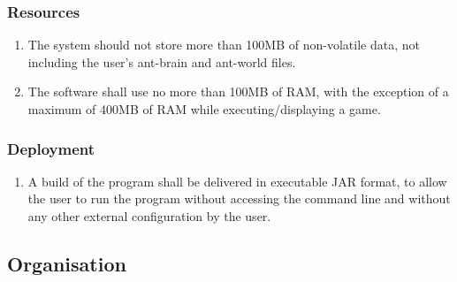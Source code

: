 \documentclass[11pt]{article}
\providecommand{\tightlist}{%
  \setlength{\itemsep}{0pt}\setlength{\parskip}{0pt}}
\begin{document}
\subsubsection{Resources}\label{resources}

\begin{enumerate}
\def\labelenumi{\arabic{enumi}.}
\tightlist
\item
  The system should not store more than 100MB of non-volatile data, not
  including the user's ant-brain and ant-world files.
\item
  The software shall use no more than 100MB of RAM, with the exception
  of a maximum of 400MB of RAM while executing/displaying a game.
\end{enumerate}

\subsubsection{Deployment}\label{deployment}

\begin{enumerate}
\def\labelenumi{\arabic{enumi}.}
\tightlist
\item
  A build of the program shall be delivered in executable JAR format, to
  allow the user to run the program without accessing the command line
  and without any other external configuration by the user.
\end{enumerate}

\subsection{Organisation}\label{organisation}
\end{document}
